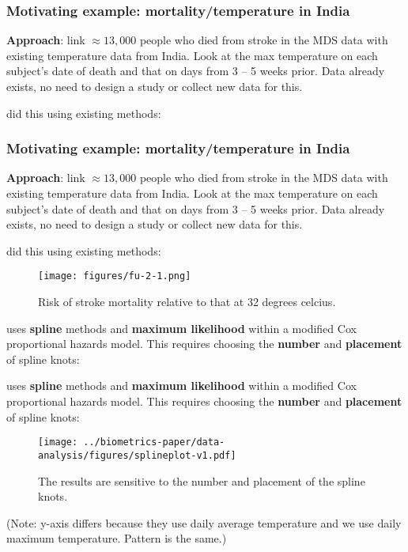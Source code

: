 \documentclass[10pt,usenames,dvipsnames,t]{beamer}
\begin{document}
\begin{frame}
\frametitle{Motivating example: mortality/temperature in India}

\textbf{Approach}: link $\approx 13,000$ people who died from stroke in the MDS data with existing temperature data from India. \pause Look at the max temperature on each subject's date of death and that on days from 3 -- 5 weeks prior. \pause Data already exists, no need to design a study or collect new data for this.

\pause

\citet{temperature} did this using existing methods:

\end{frame}

\begin{frame}

\frametitle{Motivating example: mortality/temperature in India}

\textbf{Approach}: link $\approx 13,000$ people who died from stroke in the MDS data with existing temperature data from India. Look at the max temperature on each subject's date of death and that on days from 3 -- 5 weeks prior. Data already exists, no need to design a study or collect new data for this.

\citet{temperature} did this using existing methods:

\begin{figure}[h]
\centering
\texttt{[image: figures/fu-2-1.png]}
\caption{Risk of stroke mortality relative to that at 32 degrees celcius.}
\label{fig:fu1}
\end{figure}

\end{frame}

\begin{frame}

\citet{temperature} uses \textbf{spline} methods and \textbf{maximum likelihood} within a modified Cox proportional hazards model. \pause This requires choosing the \textbf{number} and \textbf{placement} of spline knots:

\end{frame}

\begin{frame}

\citet{temperature} uses \textbf{spline} methods and \textbf{maximum likelihood} within a modified Cox proportional hazards model. This requires choosing the \textbf{number} and \textbf{placement} of spline knots:

\begin{figure}[h]
\centering
\texttt{[image: ../biometrics-paper/data-analysis/figures/splineplot-v1.pdf]}
\caption{The results are sensitive to the number and placement of the spline knots.}
\label{fig:indian}
\end{figure}
\vspace{-.2in}
{\small (Note: y-axis differs because they use daily average temperature and we use daily maximum temperature. Pattern is the same.)}

\end{frame}
\end{document}
